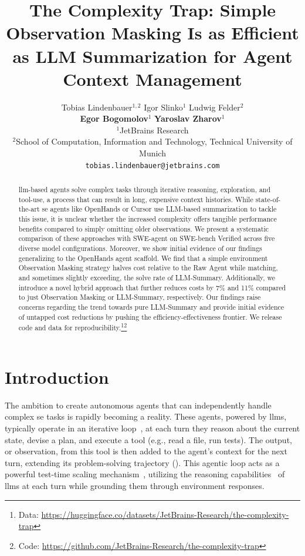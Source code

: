 \documentclass{article}
\title{The Complexity Trap: Simple Observation Masking Is as Efficient as LLM Summarization for Agent Context Management}
\author{%
Tobias Lindenbauer$^{1,2}$ \quad Igor Slinko$^{1}$ \quad Ludwig Felder$^{2}$ \\ 
\textbf{Egor Bogomolov}$^1$ \quad \textbf{Yaroslav Zharov}$^1$\\
$^1$JetBrains Research \\
$^2$School of Computation, Information and Technology, Technical University of Munich \\
\texttt{tobias.lindenbauer@jetbrains.com}
}
\begin{document}
\maketitle

 

\begin{abstract}
  \ac{llm}-based agents solve complex tasks through iterative reasoning, exploration, and tool-use, a process that can result in long, expensive context histories. While state-of-the-art \ac{se} agents like OpenHands or Cursor use LLM-based summarization to tackle this issue, it is unclear whether the increased complexity offers tangible performance benefits compared to simply omitting older observations.
  We present a systematic comparison of these approaches with SWE-agent on SWE-bench Verified across five diverse model configurations. Moreover, we show initial evidence of our findings generalizing to the OpenHands agent scaffold.
  We find that a simple environment Observation Masking strategy halves cost relative to the Raw Agent while matching, and sometimes slightly exceeding, the solve rate of LLM-Summary. Additionally, we introduce a novel hybrid approach that further reduces costs by 7\% and 11\% compared to just Observation Masking or LLM-Summary, respectively.
 Our findings raise concerns regarding the trend towards pure LLM-Summary and provide initial evidence of untapped cost reductions by pushing the efficiency-effectiveness frontier. 
 We release code and data for reproducibility.\footnote{Data: \url{https://huggingface.co/datasets/JetBrains-Research/the-complexity-trap}}\footnote{Code: \url{https://github.com/JetBrains-Research/the-complexity-trap}}
\end{abstract}

\section{Introduction}
The ambition to create autonomous agents that can independently handle complex \ac{se} tasks is rapidly becoming a reality. These agents, powered by \acp{llm}, typically operate in an iterative loop~\cite{yao_react_2023,wang_executable_2024}, at each turn they reason about the current state, devise a plan, and execute a tool (e.g., read a file, run tests). The output, or observation, from this tool is then added to the agent's context for the next turn, extending its problem-solving trajectory (). This agentic loop acts as a powerful test-time scaling mechanism~\cite{snell_scaling_test_time_2024,liu_test_time_1b_405b_2025,wu_inference_scaling_laws_2025}, utilizing the reasoning capabilities~\cite{wei_chain--thought_2023} of \acp{llm} at each turn while grounding them through environment responses.
\end{document}
